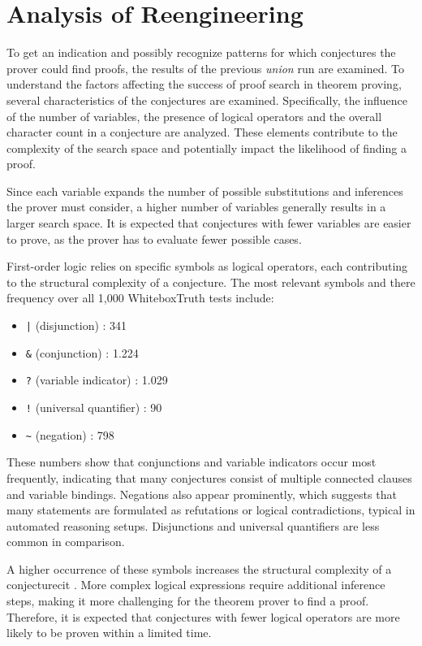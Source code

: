 \documentclass[english,version-2020-11]{uzl-thesis}
\begin{document}
\section{Analysis of Reengineering}

To get an indication and possibly recognize patterns for which conjectures the prover could find proofs, the results of the previous \textit{union} run are examined. To understand the factors affecting the success of proof search in theorem proving, several characteristics of the conjectures are examined. Specifically, the influence of the number of variables, the presence of logical operators and the overall character count in a conjecture are analyzed. These elements contribute to the complexity of the search space and potentially impact the likelihood of finding a proof.

Since each variable expands the number of possible substitutions and inferences the prover must consider, a higher number of variables generally results in a larger search space. It is expected that conjectures with fewer variables are easier to prove, as the prover has to evaluate fewer possible cases.

First-order logic relies on specific symbols as logical operators, each contributing to the structural complexity of a conjecture. The most relevant symbols and there frequency over all 1,000 WhiteboxTruth tests include:
\begin{itemize}
    \item \texttt{|} (disjunction) : 341
    \item \texttt{\&} (conjunction) : 1.224
    \item \texttt{?} (variable indicator) : 1.029
    \item \texttt{!} (universal quantifier) : 90
    \item \texttt{\~{}} (negation) : 798
\end{itemize}

These numbers show that conjunctions and variable indicators occur most frequently, indicating that many conjectures consist of multiple connected clauses and variable bindings. Negations also appear prominently, which suggests that many statements are formulated as refutations or logical contradictions, typical in automated reasoning setups. Disjunctions and universal quantifiers are less common in comparison.


A higher occurrence of these symbols increases the structural complexity of a conjecturecit \cite{Dantsin2001}. More complex logical expressions require additional inference steps, making it more challenging for the theorem prover to find a proof. Therefore, it is expected that conjectures with fewer logical operators are more likely to be proven within a limited time.
\end{document}
